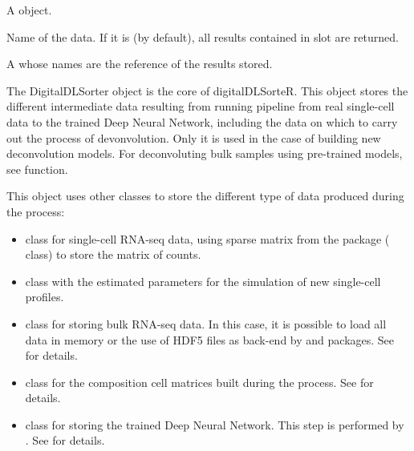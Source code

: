 \documentclass[a4paper]{book}
\begin{document}
%
\begin{Arguments}
\begin{ldescription}
\item[\code{object}] A  object.

\item[\code{name.data}] Name of the data. If it is  (by default),
all results contained in  slot are returned.

\item[\code{value}] A  whose names are the reference of the results
stored.
\end{ldescription}
\end{Arguments}
%
\begin{Description}\relax
The DigitalDLSorter object is the core of digitalDLSorteR. This object stores
the different intermediate data resulting from running pipeline from real
single-cell data to the trained Deep Neural Network, including the data on
which to carry out the process of devonvolution. Only it is used in the case
of building new deconvolution models. For deconvoluting bulk samples using
pre-trained models, see  function.
\end{Description}
%
\begin{Details}\relax
This object uses other classes to store the different type of data produced
during the process: \begin{itemize}
 \item {} class for
single-cell RNA-seq data, using sparse matrix from the  package
( class) to store the matrix of counts. \item 
{} class with the estimated parameters for the simulation of
new single-cell profiles. \item {} class for storing
bulk RNA-seq data. In this case, it is possible to load all data in memory or
the use of HDF5 files as back-end by  and 
packages. See  for details. \item 
{} class for the composition cell matrices
built during the process. See  for details. \item 
{} class for storing the trained Deep Neural
Network. This step is performed by . See
 for details. 
\end{itemize}

\end{Details}
\end{document}
